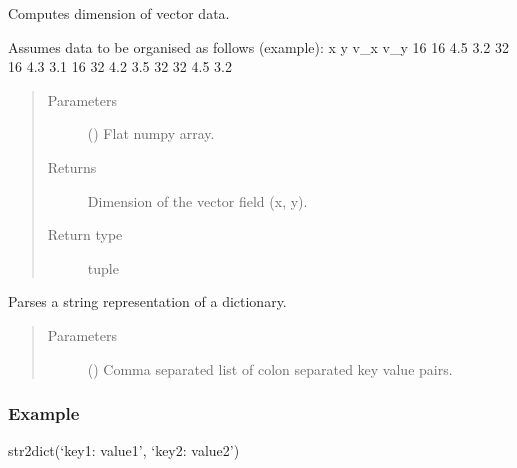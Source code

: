 \documentclass[letterpaper,10pt,english]{sphinxmanual}
\begin{document}

\begin{fulllineitems}
\label{\detokenize{open_piv_gui_tools:openpivgui.open_piv_gui_tools.get_dim}}
Computes dimension of vector data.

Assumes data to be organised as follows (example):
x  y  v\_x v\_y
16 16 4.5 3.2
32 16 4.3 3.1
16 32 4.2 3.5
32 32 4.5 3.2
\begin{quote}\begin{description}
\item[{Parameters}] \leavevmode
{} () \textendash{} Flat numpy array.

\item[{Returns}] \leavevmode
Dimension of the vector field (x, y).

\item[{Return type}] \leavevmode
tuple

\end{description}\end{quote}

\end{fulllineitems}


\begin{fulllineitems}
\label{\detokenize{open_piv_gui_tools:openpivgui.open_piv_gui_tools.str2dict}}
Parses a string representation of a dictionary.
\begin{quote}\begin{description}
\item[{Parameters}] \leavevmode
{} () \textendash{} Comma separated list of colon separated key value pairs.

\end{description}\end{quote}
\subsubsection*{Example}

str2dict(‘key1: value1’, ‘key2: value2’)

\end{fulllineitems}
\end{document}

